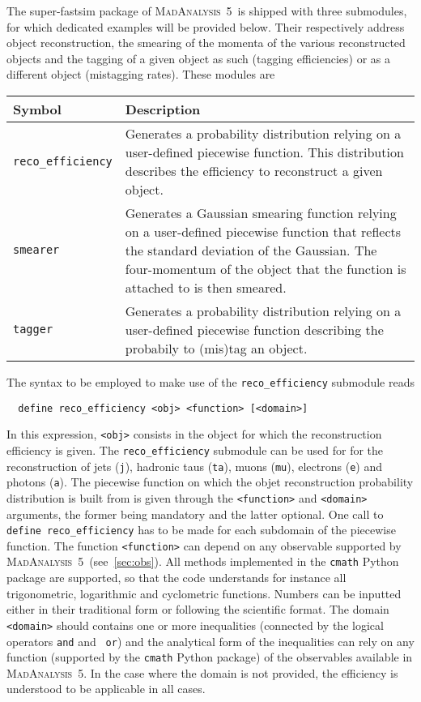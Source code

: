 \documentclass[a4paper]{article}
\newcommand{\MA}{\textsc{MadAnalysis}~5}
\begin{document}
\vspace{2cm}

\noindent The super-fastsim package of \MA\ is shipped with three
submodules, for which dedicated examples will be provided below. Their
respectively address object reconstruction, the smearing of the momenta of the
various reconstructed objects and the tagging of a given object as such (tagging
efficiencies) or as a different object (mistagging rates). These modules are
\renewcommand{\arraystretch}{1.2}%
\begin{center}\begin{tabular}{l p{8.4cm}}
  \hline
  Symbol& Description\\
  \hline
  \color{ao} \verb?reco_efficiency? & Generates a probability
    distribution relying on a user-defined piecewise function. This distribution
    describes the efficiency to reconstruct a given object.\\
  \color{ao} \verb?smearer?  &  Generates a Gaussian smearing function relying
    on a user-defined piecewise function that reflects the standard deviation of
    the Gaussian. The four-momentum of the object that the function is attached
    to is then smeared.\\
  \color{ao} \verb?tagger?   & Generates a probability distribution relying on a
    user-defined piecewise function describing the probabily to (mis)tag an
    object. \\
  \hline
 \end{tabular}
\end{center}
\noindent The syntax to be employed to make use of the \verb+reco_efficiency+
submodule reads
{\color{ao} \begin{verbatim}
  define reco_efficiency <obj> <function> [<domain>]
\end{verbatim}}
\noindent In this expression, \verb+<obj>+ consists in the object for which the
reconstruction efficiency is given. The {\tt reco\_efficiency} submodule can be
used for for the reconstruction of jets (\verb+j+), hadronic taus (\verb+ta+),
muons (\verb+mu+),
electrons (\verb+e+) and photons (\verb+a+). The piecewise function on which the
objet reconstruction probability distribution is built from is given through the
{\tt <function>} and {\tt <domain>} arguments, the former being mandatory and
the latter optional. One call to {\tt define reco\_efficiency} has to be
made for each subdomain of the piecewise function. The function {\tt <function>}
can depend on any observable supported by \MA\ (see~\autoref{sec:obs}). All
methods implemented in the {\tt cmath} {\sc Python} package are supported, so
that the code understands for instance all trigonometric, logarithmic and
cyclometric functions. Numbers can be inputted either in their traditional form
or following the scientific format. The domain {\tt <domain>} should contains
one or more inequalities (connected by the logical operators {\tt and} and {\tt
or}) and the analytical form of the inequalities can rely on any function
(supported by the {\tt cmath} {\sc Python} package) of the observables available
in \MA. In the case where the domain is not provided, the efficiency is
understood to be applicable in all cases.
\end{document}
